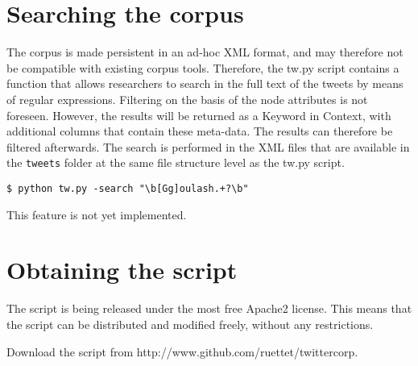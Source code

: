 \documentclass[a4paper,11pt]{article}
\begin{document}
\section{Searching the corpus}

The corpus is made persistent in an ad-hoc XML format, and may therefore not be compatible with existing corpus tools. Therefore, the tw.py script contains a function that allows researchers to search in the full text of the tweets by means of regular expressions. Filtering on the basis of the node attributes is not foreseen. However, the results will be returned as a Keyword in Context, with additional columns that contain these meta-data. The results can therefore be filtered afterwards. The search is performed in the XML files that are available in the \texttt{tweets} folder at the same file structure level as the tw.py script.

\begin{verbatim}
$ python tw.py -search "\b[Gg]oulash.+?\b"
\end{verbatim}

This feature is not yet implemented.

\section{Obtaining the script}

The script is being released under the most free Apache2 license. This means that the script can be distributed and modified freely, without any restrictions.

Download the script from http://www.github.com/ruettet/twittercorp.

\end{document}
